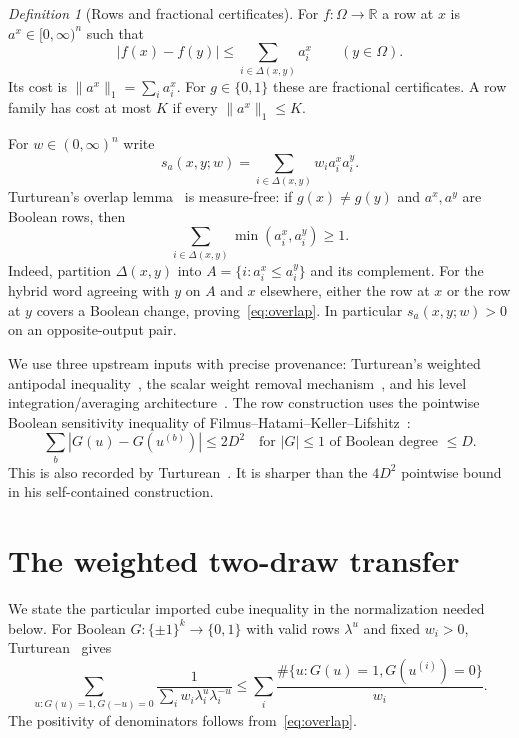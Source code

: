 \documentclass[11pt]{article}
\numberwithin{equation}{section}
\theoremstyle{remark}
\newtheorem{definition}[theorem]{Definition}
\newcommand{\R}{\mathbb R}
\newcommand{\norm}[1]{\lVert #1\rVert}
\newcommand{\delt}{\Delta}
\begin{document}
\begin{definition}[Rows and fractional certificates]
For $f:\Omega\to\R$ a row at $x$ is $a^x\in[0,\infty)^n$ such that
\begin{equation}\label{eq:row}
 |f(x)-f(y)|\le\sum_{i\in\delt(x,y)}a_i^x\qquad(y\in\Omega).
\end{equation}
Its cost is $\norm{a^x}_1=\sum_ia_i^x$. For $g\in\{0,1\}$ these are fractional certificates. A row family has cost at most $K$ if every $\norm{a^x}_1\le K$.
\end{definition}
For $w\in(0,\infty)^n$ write
\begin{equation}\label{eq:sxy}
 s_a(x,y;w)=\sum_{i\in\delt(x,y)}w_i a_i^x a_i^y.
\end{equation}
Turturean's overlap lemma~\cite[Lemma~4.1]{Tur26} is measure-free: if $g(x)\ne g(y)$ and $a^x,a^y$ are Boolean rows, then
\begin{equation}\label{eq:overlap}
 \sum_{i\in\delt(x,y)}\min(a_i^x,a_i^y)\ge1.
\end{equation}
Indeed, partition $\delt(x,y)$ into $A=\{i:a_i^x\le a_i^y\}$ and its complement. For the hybrid word agreeing with $y$ on $A$ and $x$ elsewhere, either the row at $x$ or the row at $y$ covers a Boolean change, proving~\eqref{eq:overlap}. In particular $s_a(x,y;w)>0$ on an opposite-output pair.

We use three upstream inputs with precise provenance: Turturean's weighted antipodal inequality~\cite[Theorem~4.3]{Tur26}, the scalar weight removal mechanism~\cite[Lemma~5.3]{Tur26}, and his level integration/averaging architecture~\cite[Theorems~7.6, 7.10, 8.3]{Tur26}. The row construction uses the pointwise Boolean sensitivity inequality of Filmus--Hatami--Keller--Lifshitz~\cite[Theorem~3.3]{FHKL16}:
\begin{equation}\label{eq:fhkl}
 \sum_{b}|G(u)-G(u^{(b)})|\le2D^2
 \quad\text{for }|G|\le1\text{ of Boolean degree }\le D.
\end{equation}
This is also recorded by Turturean~\cite[Remark~6.9 and Remark~8.4]{Tur26}. It is sharper than the $4D^2$ pointwise bound in his self-contained construction.

\section{The weighted two-draw transfer}\label{sec:transfer}
We state the particular imported cube inequality in the normalization needed below. For Boolean $G:\{\pm1\}^k\to\{0,1\}$ with valid rows $\lambda^u$ and fixed $w_i>0$, Turturean~\cite[Theorem~4.3]{Tur26} gives
\begin{equation}\label{eq:antipodal}
 \sum_{u:G(u)=1,G(-u)=0}
 \frac1{\sum_iw_i\lambda_i^u\lambda_i^{-u}}
 \le\sum_i\frac{\#\{u:G(u)=1,G(u^{(i)})=0\}}{w_i}.
\end{equation}
The positivity of denominators follows from~\eqref{eq:overlap}.
\end{document}
